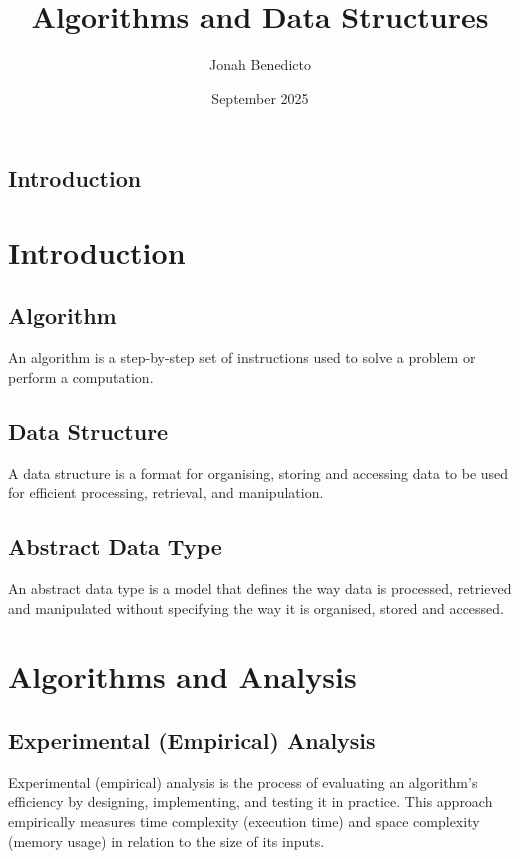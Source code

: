 \documentclass{book}
\title{Algorithms and Data Structures}
\author{Jonah Benedicto}
\date{September 2025}
\begin{document}
\maketitle

\section*{Introduction}

\tableofcontents

\chapter{Introduction}

\section{Algorithm}

An algorithm is a step-by-step set of instructions used to solve a problem or perform a computation.

\section{Data Structure}

A data structure is a format for organising, storing and accessing data to be used for efficient processing, retrieval, and manipulation.

\section{Abstract Data Type}

An abstract data type is a model that defines the way data is processed, retrieved and manipulated without specifying the way it is organised, stored and accessed.

\chapter{Algorithms and Analysis}

\section{Experimental (Empirical) Analysis}

Experimental (empirical) analysis is the process of evaluating an algorithm's efficiency by designing, implementing, and testing it in practice. This approach empirically measures time complexity (execution time) and space complexity (memory usage) in relation to the size of its inputs.
\end{document}
